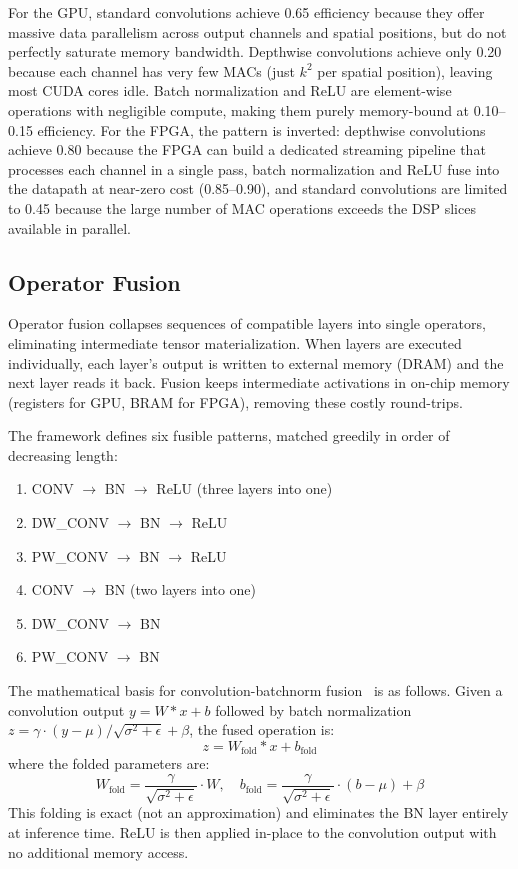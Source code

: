 \documentclass[runningheads]{llncs}
\begin{document}
For the GPU, standard convolutions achieve 0.65 efficiency because they offer massive data parallelism across output channels and spatial positions, but do not perfectly saturate memory bandwidth. Depthwise convolutions achieve only 0.20 because each channel has very few MACs (just $k^2$ per spatial position), leaving most CUDA cores idle. Batch normalization and ReLU are element-wise operations with negligible compute, making them purely memory-bound at 0.10--0.15 efficiency. For the FPGA, the pattern is inverted: depthwise convolutions achieve 0.80 because the FPGA can build a dedicated streaming pipeline that processes each channel in a single pass, batch normalization and ReLU fuse into the datapath at near-zero cost (0.85--0.90), and standard convolutions are limited to 0.45 because the large number of MAC operations exceeds the DSP slices available in parallel.

\subsection{Operator Fusion}\label{sec:fusion}

Operator fusion collapses sequences of compatible layers into single operators, eliminating intermediate tensor materialization. When layers are executed individually, each layer's output is written to external memory (DRAM) and the next layer reads it back. Fusion keeps intermediate activations in on-chip memory (registers for GPU, BRAM for FPGA), removing these costly round-trips.

The framework defines six fusible patterns, matched greedily in order of decreasing length:
\begin{enumerate}
    \item CONV $\rightarrow$ BN $\rightarrow$ ReLU (three layers into one)
    \item DW\_CONV $\rightarrow$ BN $\rightarrow$ ReLU
    \item PW\_CONV $\rightarrow$ BN $\rightarrow$ ReLU
    \item CONV $\rightarrow$ BN (two layers into one)
    \item DW\_CONV $\rightarrow$ BN
    \item PW\_CONV $\rightarrow$ BN
\end{enumerate}

The mathematical basis for convolution-batchnorm fusion~\cite{ioffe2015,tvm2018} is as follows. Given a convolution output $y = W \ast x + b$ followed by batch normalization $z = \gamma \cdot (y - \mu) / \sqrt{\sigma^2 + \epsilon} + \beta$, the fused operation is:
\begin{equation}\label{eq:bn_fold}
    z = W_{\text{fold}} \ast x + b_{\text{fold}}
\end{equation}
where the folded parameters are:
\begin{equation}
    W_{\text{fold}} = \frac{\gamma}{\sqrt{\sigma^2 + \epsilon}} \cdot W, \quad
    b_{\text{fold}} = \frac{\gamma}{\sqrt{\sigma^2 + \epsilon}} \cdot (b - \mu) + \beta
\end{equation}
This folding is exact (not an approximation) and eliminates the BN layer entirely at inference time. ReLU is then applied in-place to the convolution output with no additional memory access.
\end{document}
